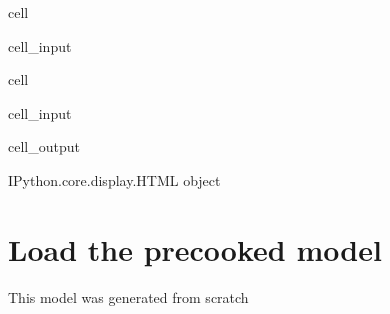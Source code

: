 \documentclass[letterpaper,10pt,english]{jupyterBook}
\begin{document}
\begin{sphinxuseclass}{cell}\begin{sphinxVerbatimInput}

\begin{sphinxuseclass}{cell_input}
\begin{sphinxVerbatim}[commandchars=\\\{\}]
   
\end{sphinxVerbatim}

\end{sphinxuseclass}\end{sphinxVerbatimInput}

\end{sphinxuseclass}
\begin{sphinxuseclass}{cell}\begin{sphinxVerbatimInput}

\begin{sphinxuseclass}{cell_input}
\begin{sphinxVerbatim}[commandchars=\\\{\}]
   
\end{sphinxVerbatim}

\end{sphinxuseclass}\end{sphinxVerbatimInput}
\begin{sphinxVerbatimOutput}

\begin{sphinxuseclass}{cell_output}
\begin{sphinxVerbatim}[commandchars=\\\{\}]
\PYGZlt{}IPython.core.display.HTML object\PYGZgt{}
\end{sphinxVerbatim}

\end{sphinxuseclass}\end{sphinxVerbatimOutput}

\end{sphinxuseclass}

\section{Load the precooked model}
\label{\detokenize{content/howto/smallmodel/modelstart export up:load-the-precooked-model}}
\sphinxAtStartPar
This model was generated from scratch {\hyperref[\detokenize{content/howto/smallmodel/modelstart::doc}]{}}
\end{document}
